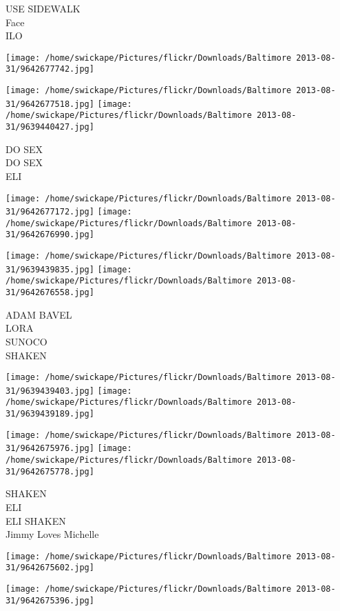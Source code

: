 \documentclass[10pt,letterpaper]{article}
\begin{document}
USE SIDEWALK\\
Face\\
ILO\\
\pagebreak

\texttt{[image: /home/swickape/Pictures/flickr/Downloads/Baltimore 2013-08-31/9642677742.jpg]}

\vspace{0.25in}
\texttt{[image: /home/swickape/Pictures/flickr/Downloads/Baltimore 2013-08-31/9642677518.jpg]}
\texttt{[image: /home/swickape/Pictures/flickr/Downloads/Baltimore 2013-08-31/9639440427.jpg]}

DO SEX\\
DO SEX\\
ELI\\
\pagebreak

\texttt{[image: /home/swickape/Pictures/flickr/Downloads/Baltimore 2013-08-31/9642677172.jpg]}
\texttt{[image: /home/swickape/Pictures/flickr/Downloads/Baltimore 2013-08-31/9642676990.jpg]}

\texttt{[image: /home/swickape/Pictures/flickr/Downloads/Baltimore 2013-08-31/9639439835.jpg]}
\texttt{[image: /home/swickape/Pictures/flickr/Downloads/Baltimore 2013-08-31/9642676558.jpg]}

ADAM BAVEL\\
LORA\\
SUNOCO\\
SHAKEN\\
\pagebreak

\texttt{[image: /home/swickape/Pictures/flickr/Downloads/Baltimore 2013-08-31/9639439403.jpg]}
\texttt{[image: /home/swickape/Pictures/flickr/Downloads/Baltimore 2013-08-31/9639439189.jpg]}

\texttt{[image: /home/swickape/Pictures/flickr/Downloads/Baltimore 2013-08-31/9642675976.jpg]}
\texttt{[image: /home/swickape/Pictures/flickr/Downloads/Baltimore 2013-08-31/9642675778.jpg]}

SHAKEN\\
ELI\\
ELI SHAKEN\\
Jimmy Loves Michelle\\
\pagebreak

\texttt{[image: /home/swickape/Pictures/flickr/Downloads/Baltimore 2013-08-31/9642675602.jpg]}

\vspace{0.25in}
\texttt{[image: /home/swickape/Pictures/flickr/Downloads/Baltimore 2013-08-31/9642675396.jpg]}
\end{document}
